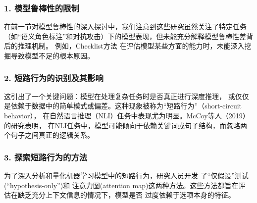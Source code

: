 %


\subsubsection*{1. 模型鲁棒性的限制}
在前一节对模型鲁棒性的深入探讨中，我们注意到这些研究虽然关注了特定任务
（如``语义角色标注''和对抗攻击）下的模型表现，但未能充分解释模型鲁棒性差背后的推理机制\cite{hendrycks2020pretrained}。
例如，Checklist方法\cite{Marco2020acl}
在评估模型某些方面的能力时，未能深入挖掘导致模型不足的根本原因。

\subsubsection*{2. 短路行为的识别及其影响}
这引出了一个关键问题：模型在处理复杂任务时是否真正进行深度推理，
或仅仅是依赖于数据中的简单模式或偏差。这种现象被称为``短路行为''（short-circuit behavior）\cite{huangacombating}，
在自然语言推理（NLI）任务中表现尤为明显。McCoy等人（2019）\cite{mccoy2019right}的研究表明，
在NLI任务中，模型可能倾向于依赖关键词或句子结构，而忽略两个句子之间真正的逻辑关系。

\subsubsection*{3. 探索短路行为的方法}

为了深入分析和量化机器学习模型中的短路行为，研究人员开发
了``仅假设''测试(``hypothesis-only'')\cite{gururangan2018annotation}和
注意力图(attention map)\cite{vig2019multiscale}这两种方法。这些方法都旨在评
估在缺乏充分上下文信息的情况下，模型是否
过度依赖于选项本身的特征。

